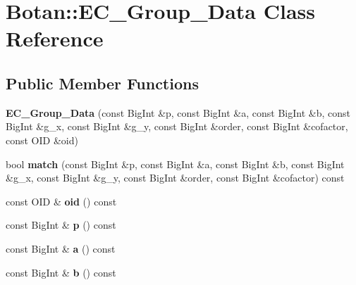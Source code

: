 \hypertarget{class_botan_1_1_e_c___group___data}{}\section{Botan\+:\+:E\+C\+\_\+\+Group\+\_\+\+Data Class Reference}
\label{class_botan_1_1_e_c___group___data}
\subsection*{Public Member Functions}
\begin{DoxyCompactItemize}
\item 
\mbox{\label{class_botan_1_1_e_c___group___data_a3389e7281c047cc1572914b924a0f54c}} 
{\bfseries E\+C\+\_\+\+Group\+\_\+\+Data} (const Big\+Int \&p, const Big\+Int \&a, const Big\+Int \&b, const Big\+Int \&g\+\_\+x, const Big\+Int \&g\+\_\+y, const Big\+Int \&order, const Big\+Int \&cofactor, const O\+ID \&oid)
\item 
\mbox{\label{class_botan_1_1_e_c___group___data_a5c6aee3ca0414cbda9ac7da878a5073e}} 
bool {\bfseries match} (const Big\+Int \&p, const Big\+Int \&a, const Big\+Int \&b, const Big\+Int \&g\+\_\+x, const Big\+Int \&g\+\_\+y, const Big\+Int \&order, const Big\+Int \&cofactor) const
\item 
\mbox{\label{class_botan_1_1_e_c___group___data_ac3f958a0317681e0ee52f953a969db7c}} 
const O\+ID \& {\bfseries oid} () const
\item 
\mbox{\label{class_botan_1_1_e_c___group___data_a2e4925d50d43a80d4df37f57c35361e6}} 
const Big\+Int \& {\bfseries p} () const
\item 
\mbox{\label{class_botan_1_1_e_c___group___data_a8969fc50bffb46bc1536db50dbe2f6a1}} 
const Big\+Int \& {\bfseries a} () const
\item 
\mbox{\label{class_botan_1_1_e_c___group___data_a632a976948c11da88e55446d0713d0a8}} 
const Big\+Int \& {\bfseries b} () const
\item 
\mbox{\label{class_botan_1_1_e_c___group___data_acb89109b36c1bfcccce07bcbea9b1741}} 

\end{DoxyCompactItemize}
